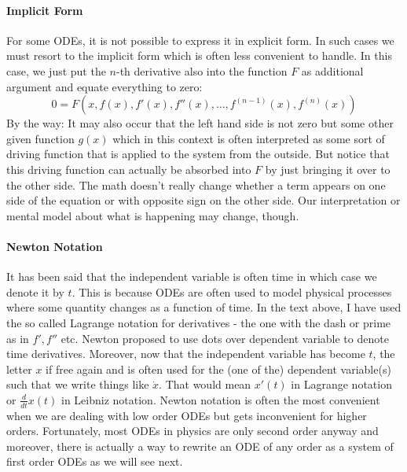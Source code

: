 \paragraph{Implicit Form}
For some ODEs, it is not possible to express it in explicit form. In such cases we must resort to the implicit form which is often less convenient to handle. In this case, we just put the $n$-th derivative also into the function $F$ as additional argument and equate everything to zero:
\begin{equation}
0 = F(x, f(x), f'(x), f''(x), \ldots, f^{(n-1)}(x), f^{(n)}(x))
\end{equation}
By the way: It may also occur that the left hand side is not zero but some other given function $g(x)$ which in this context is often interpreted as some sort of driving function that is applied to the system from the outside. But notice that this driving function can actually be absorbed into $F$ by just bringing it over to the other side. The math doesn't really change whether a term appears on one side of the equation or with opposite sign on the other side. Our interpretation or mental model about what is happening may change, though.


\paragraph{Newton Notation}
It has been said that the independent variable is often time in which case we denote it by $t$. This is because ODEs are often used to model physical processes where some quantity changes as a function of time. In the text above, I have used the so called Lagrange notation for derivatives - the one with the dash or prime as in $f', f''$ etc. Newton proposed to use dots over dependent variable to denote time derivatives. Moreover, now that the independent variable has become $t$, the letter $x$ if free again and is often used for the (one of the) dependent variable(s) such that we write things like $\dot{x}$. That would mean $x'(t)$ in Lagrange notation or $\frac{d}{dt} x(t)$ in Leibniz notation. Newton notation is often the most convenient when we are dealing with low order ODEs but gets inconvenient for higher orders. Fortunately, most ODEs in physics are only second order anyway and moreover, there is actually a way to rewrite an ODE of any order as a system of first order ODEs as we will see next.

